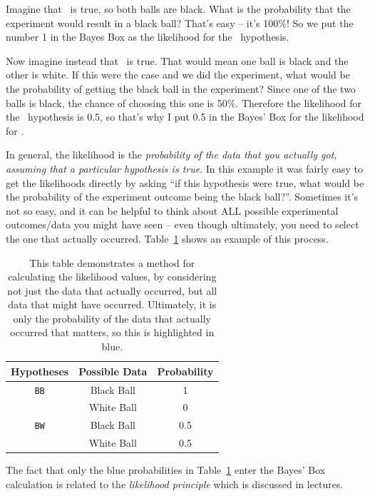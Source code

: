 Imagine that \bb~is true, so both balls are black. What is the probability that
the experiment would result in a black ball? That's easy -- it's 100\%! So we
put the number 1 in the Bayes Box as the likelihood for the \bb~hypothesis.

Now imagine instead that \bw~is true. That would mean one ball is black and the
other is white. If this were the case and we did the experiment, what would be
the probability of getting the black ball in the experiment? Since one of the
two balls is black, the chance of choosing this one is 50\%. Therefore the
likelihood for the \bw~hypothesis is 0.5, so that's why I put 0.5 in the Bayes'
Box for the likelihood for \bw.

In general, the likelihood is the {\it probability of the data that you actually
got, assuming that a particular hypothesis is true}. In this example it was
fairly easy to get the likelihoods directly by asking ``if this hypothesis
were true, what would be the probability of the experiment outcome being the
black ball?''. Sometimes it's not so easy, and it can be helpful to think about
ALL possible experimental outcomes/data you might have seen -- even though
ultimately, you need to select the one that actually occurred.
Table~\ref{tab:all_data} shows an example of this process.

\begin{table}[h!]
\begin{center}
\begin{tabular}{|c|c|c|}
\hline
{\bf Hypotheses} & {\bf Possible Data} & {\bf Probability} \\
\hline
{\tt BB} & {\color{blue} Black Ball} & {\color{blue} 1}\\
         & White Ball & 0 \\
\hline
{\tt BW} & {\color{blue} Black Ball} & {\color{blue} 0.5} \\
         & White Ball & 0.5 \\
\hline
\end{tabular}
\caption{This table demonstrates a method for calculating the likelihood
values, by considering not just the data that actually occurred, but all
data that might have occurred. Ultimately, it is only the probability of the
data that actually occurred that matters, so this is highlighted in blue.
\label{tab:all_data}}
\end{center}
\end{table}
The fact that only the blue probabilities in Table~\ref{tab:all_data} enter the
Bayes' Box calculation is related to the {\it likelihood principle} which is
discussed in lectures.

